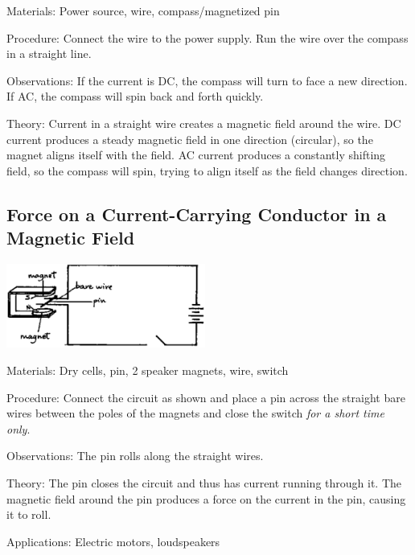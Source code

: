 \begin{multicols}{2}
\begin{description*}
\item[Materials:]{Power source, wire, compass/magnetized pin}
\item[Procedure:]{Connect the wire to the power supply. Run the wire over the compass in a straight line.}
\item[Observations:]{If the current is DC, the compass will turn to face a new direction. If AC, the compass will spin back and forth quickly.}
\item[Theory:]{Current in a straight wire creates a magnetic field around the wire. DC current produces a steady magnetic field in one direction (circular), so the magnet aligns itself with the field. AC current produces a constantly shifting field, so the compass will spin, trying to align itself as the field changes direction.}
\end{description*}

\subsection{Force on a Current-Carrying Conductor in a Magnetic Field} 

\begin{center}
\includegraphics[width=0.49\textwidth]{./img/source/force-wire.png}
\end{center}

\begin{description*}
\item[Materials:]{Dry cells, pin, 2 speaker magnets, wire, switch}
\item[Procedure:]{Connect the circuit as shown and place a pin across the straight bare wires between the poles of the magnets and close the switch \emph{for a short time only}.}
\item[Observations:]{The pin rolls along the straight wires.}
\item[Theory:]{The pin closes the circuit and thus has current running through it. The magnetic field around the pin produces a force on the current in the pin, causing it to roll.}
\item[Applications:]{Electric motors, loudspeakers}
\end{description*}


\end{multicols}
